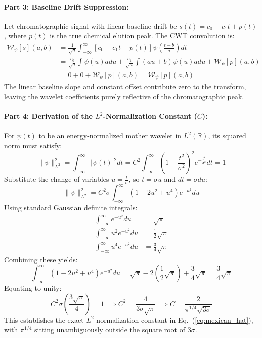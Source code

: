 \documentclass[11pt,twoside,openright]{book}
\begin{document}
\paragraph{Part 3: Baseline Drift Suppression:}
Let chromatographic signal with linear baseline drift be $s(t) = c_0 + c_1 t + p(t)$, where $p(t)$ is the true chemical elution peak.
The CWT convolution is:
\begin{align*}
\mathcal{W}_\psi[s](a, b) &= \frac{1}{\sqrt{a}} \int_{-\infty}^\infty \left[ c_0 + c_1 t + p(t) \right] \psi\left(\frac{t-b}{a}\right) dt \\
&= \frac{c_0}{\sqrt{a}} \int \psi(u) a du + \frac{c_1}{\sqrt{a}} \int (a u + b) \psi(u) a du + \mathcal{W}_\psi[p](a, b) \\
&= 0 + 0 + \mathcal{W}_\psi[p](a, b) = \mathcal{W}_\psi[p](a, b)
\end{align*}
The linear baseline slope and constant offset contribute zero to the transform, leaving the wavelet coefficients purely reflective of the chromatographic peak.

\paragraph{Part 4: Derivation of the $L^2$-Normalization Constant ($C$):}
For $\psi(t)$ to be an energy-normalized mother wavelet in $L^2(\mathbb{R})$, its squared norm must satisfy:
\begin{equation*}
\|\psi\|_{L^2}^2 = \int_{-\infty}^\infty |\psi(t)|^2 dt = C^2 \int_{-\infty}^\infty \left( 1 - \frac{t^2}{\sigma^2} \right)^2 e^{-\frac{t^2}{\sigma^2}} dt = 1
\end{equation*}
Substitute the change of variables $u = \frac{t}{\sigma}$, so $t = \sigma u$ and $dt = \sigma du$:
\begin{equation*}
\|\psi\|_{L^2}^2 = C^2 \sigma \int_{-\infty}^\infty \left( 1 - 2u^2 + u^4 \right) e^{-u^2} du
\end{equation*}
Using standard Gaussian definite integrals:
\begin{align*}
\int_{-\infty}^\infty e^{-u^2} du &= \sqrt{\pi} \\
\int_{-\infty}^\infty u^2 e^{-u^2} du &= \frac{1}{2}\sqrt{\pi} \\
\int_{-\infty}^\infty u^4 e^{-u^2} du &= \frac{3}{4}\sqrt{\pi}
\end{align*}
Combining these yields:
\begin{equation*}
\int_{-\infty}^\infty \left( 1 - 2u^2 + u^4 \right) e^{-u^2} du = \sqrt{\pi} - 2\left(\frac{1}{2}\sqrt{\pi}\right) + \frac{3}{4}\sqrt{\pi} = \frac{3}{4}\sqrt{\pi}
\end{equation*}
Equating to unity:
\begin{equation*}
C^2 \sigma \left( \frac{3\sqrt{\pi}}{4} \right) = 1 \implies C^2 = \frac{4}{3\sigma\sqrt{\pi}} \implies C = \frac{2}{\pi^{1/4}\sqrt{3\sigma}}
\end{equation*}
This establishes the exact $L^2$-normalization constant in Eq.~(\ref{eq:mexican_hat}), with $\pi^{1/4}$ sitting unambiguously outside the square root of $3\sigma$.
\end{document}
